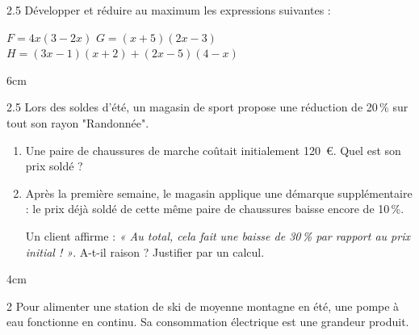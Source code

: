 \documentclass[a4paper]{book}
\begin{document}
{    \begin{exerciceNote}{2.5}
        Développer et réduire au maximum les expressions suivantes :
        \medskip
        
        $F = 4x(3 - 2x)$ \hspace{1cm} $G = (x + 5)(2x - 3)$ \hspace{1cm} $H = (3x - 1)(x + 2) + (2x - 5)(4 - x)$
        
        \begin{ZoneReponse}{6cm}
        \end{ZoneReponse}
    \end{exerciceNote}
    
    
    \begin{exerciceNote}{2.5}
        Lors des soldes d'été, un magasin de sport propose une réduction de 20\,\% sur tout son rayon "Randonnée". 
        \begin{enumerate}
            \item Une paire de chaussures de marche coûtait initialement 120~\euro. Quel est son prix soldé ?
            \item Après la première semaine, le magasin applique une démarque supplémentaire : le prix déjà soldé de cette même paire de chaussures baisse encore de 10\,\%. 
            
            Un client affirme : \textit{« Au total, cela fait une baisse de 30\,\% par rapport au prix initial ! »}. A-t-il raison ? Justifier par un calcul.
        \end{enumerate}
        
        \begin{ZoneReponse}{4cm}
        \end{ZoneReponse}
    \end{exerciceNote}


\newpage
    
    
    \begin{exerciceNote}{2}
        Pour alimenter une station de ski de moyenne montagne en été, une pompe à eau fonctionne en continu. Sa consommation électrique est une grandeur produit.
        

\end{exerciceNote}}
\end{document}
